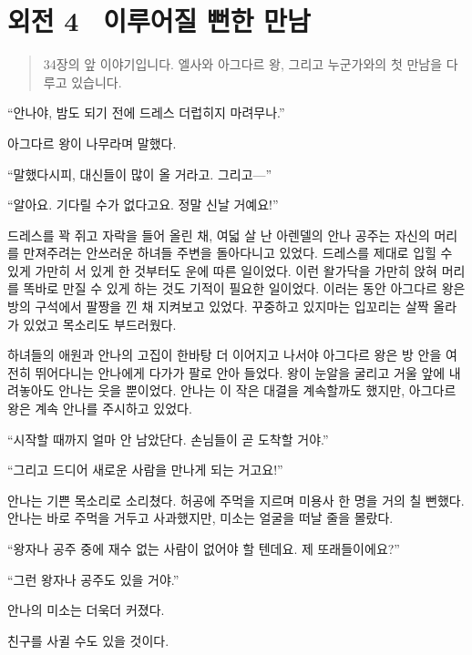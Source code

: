 

\chapter[외전4. 이루어질 뻔한 만남][외전 4\hspace*{.5em}이루어질 뻔한 만남]{외전 4 \ 이루어질 뻔한 만남}



\begin{quote}

\small 34장의 앞 이야기입니다. 엘사와 아그다르 왕, 그리고 누군가와의 첫 만남을 다루고 있습니다.

\end{quote} %

``안나야, 밤도 되기 전에 드레스 더럽히지 마려무나.''

아그다르 왕이 나무라며 말했다.

``말했다시피, 대신들이 많이 올 거라고. 그리고—''

``알아요. 기다릴 수가 없다고요. 정말 신날 거예요!''

드레스를 꽉 쥐고 자락을 들어 올린 채, 여덟 살 난 아렌델의 안나 공주는 자신의 머리를 만져주려는 안쓰러운 하녀들 주변을 돌아다니고 있었다. 드레스를 제대로 입힐 수 있게 가만히 서 있게 한 것부터도 운에 따른 일이었다. 이런 왈가닥을 가만히 앉혀 머리를 똑바로 만질 수 있게 하는 것도 기적이 필요한 일이었다. 이러는 동안 아그다르 왕은 방의 구석에서 팔짱을 낀 채 지켜보고 있었다. 꾸중하고 있지마는 입꼬리는 살짝 올라가 있었고 목소리도 부드러웠다.

하녀들의 애원과 안나의 고집이 한바탕 더 이어지고 나서야 아그다르 왕은 방 안을 여전히 뛰어다니는 안나에게 다가가 팔로 안아 들었다. 왕이 눈알을 굴리고 거울 앞에 내려놓아도 안나는 웃을 뿐이었다. 안나는 이 작은 대결을 계속할까도 했지만, 아그다르 왕은 계속 안나를 주시하고 있었다.

``시작할 때까지 얼마 안 남았단다. 손님들이 곧 도착할 거야.''

``그리고 드디어 새로운 사람을 만나게 되는 거고요!''

안나는 기쁜 목소리로 소리쳤다. 허공에 주먹을 지르며 미용사 한 명을 거의 칠 뻔했다. 안나는 바로 주먹을 거두고 사과했지만, 미소는 얼굴을 떠날 줄을 몰랐다.

``왕자나 공주 중에 재수 없는 사람이 없어야 할 텐데요. 제 또래들이에요?''

``그런 왕자나 공주도 있을 거야.''

안나의 미소는 더욱더 커졌다.

친구를 사귈 수도 있을 것이다.

